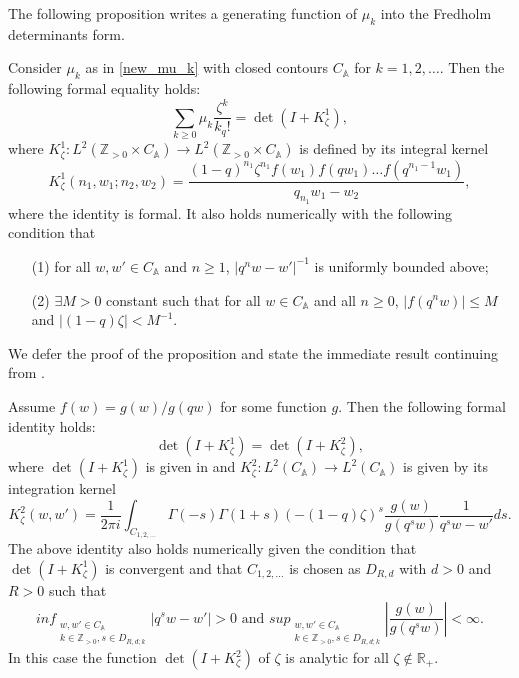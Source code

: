 The following proposition writes a generating function of $\mu_k$ into the Fredholm determinants form.
\begin{proposition}
\label{step-1-mellin-barnes}
Consider $\mu_k$ as in \eqref{new_mu_k} with closed contours $C_{\mathbb{A}}$ for $k = 1,2,\dots$. Then the following formal equality holds:
$$\sum_{k \ge 0} \mu_k \frac{\zeta^k}{k_q!} = \det(I+K_{\zeta}^{1}),$$ where $K_{\zeta}^1:L^2(\mathbb{Z}_{>0} \times C_{\mathbb{A}}) \rightarrow L^2(\mathbb{Z}_{>0} \times C_{\mathbb{A}})$ is defined by its integral kernel $$K_{\zeta}^1(n_1, w_1; n_2, w_2)= \frac{(1-q)^{n_1} \zeta^{n_1} f(w_1) f(qw_1) \dots f(q^{n_1-1}w_1)}{q_{n_1}w_1 - w_2},$$
where the identity is formal. It also holds numerically with the following condition that
\begin{enumerate}
\item[(1)] for all $w, w' \in C_{\mathbb{A}}$ and $n \ge 1$, $|q^n w - w'|^{-1}$ is uniformly bounded above;
\item[(2)] $\exists M > 0$ constant such that for all $w \in C_{\mathbb{A}}$ and all $n \ge 0$, $|f(q^n w)| \le M$ and $|(1-q) \zeta| < M^{-1}$.
\end{enumerate}
\end{proposition}

We defer the proof of the proposition and state the immediate result continuing from .

\begin{proposition}
\label{step-2-mellin-barnes}
Assume $f(w) = g(w) / g(qw)$ for some function $g$. Then the following formal identity holds:
$$\det(I+K_{\zeta}^1) = \det(I+K_{\zeta}^2),$$ where $\det(I+K_{\zeta}^1)$ is given in  and $K_{\zeta}^2:L^2(C_{\mathbb{A}}) \rightarrow L^2(C_{\mathbb{A}})$ is given by its integration kernel $$K_{\zeta}^2(w,w') = \frac{1}{2 \pi i} \int_{C_{1,2,\dots}} \Gamma(-s) \Gamma(1+s) (-(1-q)\zeta)^s \frac{g(w)}{g(q^sw)} \frac{1}{q^sw - w'} ds.$$
The above identity also holds numerically given the condition that $\det(I+K_{\zeta}^1)$ is convergent and that $C_{1,2,\dots}$ is chosen as $D_{R,d}$ with $d > 0$ and $R > 0$ such that $$ inf_{\substack{ {w, w' \in C_{\mathbb{A}}} \\ {k \in \mathbb{Z}_{>0}, s \in D_{R, d;k}} }} |q^sw - w'| > 0 \text{ and } sup_{\substack{ {w,w' \in C_{\mathbb{A}}} \\ {k \in \mathbb{Z}_{>0}, s \in D_{R,d;k}} }} \left| \frac{g(w)}{g(q^s w)} \right| < \infty.$$
In this case the function $\det(I+K^2_{\zeta})$ of $\zeta$ is analytic for all $\zeta \notin \mathbb{R}_+$.
\end{proposition}

